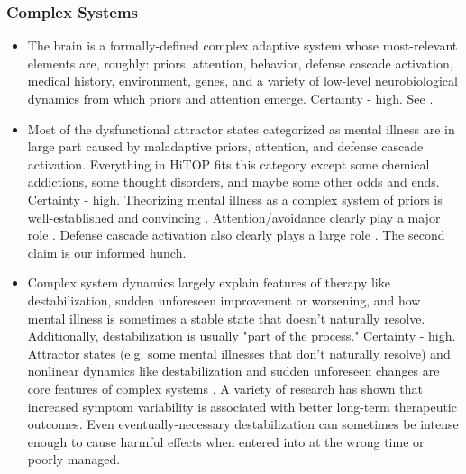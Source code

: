 \documentclass[12pt,letterpaper]{book}
\begin{document}
\subsubsection*{Complex Systems}
\begin{itemize}
    \item The brain is a formally-defined complex adaptive system whose most-relevant elements are, roughly: priors, attention, behavior, defense cascade activation, medical history, environment, genes, and a variety of low-level neurobiological dynamics from which priors and attention emerge. Certainty - high. See \textcite{friston2010free,clark2015surfing,berghSelfEvidencing,kozlowskaDefenseCascade}.
    \item Most of the dysfunctional attractor states categorized as mental illness are in large part caused by maladaptive priors, attention, and defense cascade activation. Everything in HiTOP fits this category except some chemical addictions, some thought disorders, and maybe some other odds and ends. Certainty - high. Theorizing mental illness as a complex system of priors is well-established and convincing \cite{friston2010free,hayes2020complex}. Attention/avoidance clearly play a major role \cite{berghSelfEvidencing}. Defense cascade activation also clearly plays a large role \cite{kozlowskaDefenseCascade}. The second claim is our informed hunch.
	\item Complex system dynamics largely explain features of therapy like destabilization, sudden unforeseen improvement or worsening, and how mental illness is sometimes a stable state that doesn't naturally resolve. Additionally, destabilization is usually "part of the process." Certainty - high. Attractor states (e.g. some mental illnesses that don't naturally resolve) and nonlinear dynamics like destabilization and sudden unforeseen changes are core features of complex systems \cite{olthofDestabilization}. A variety of research has shown that increased symptom variability is associated with better long-term therapeutic outcomes. Even eventually-necessary destabilization can sometimes be intense enough to cause harmful effects when entered into at the wrong time or poorly managed.

\end{itemize}
\end{document}
